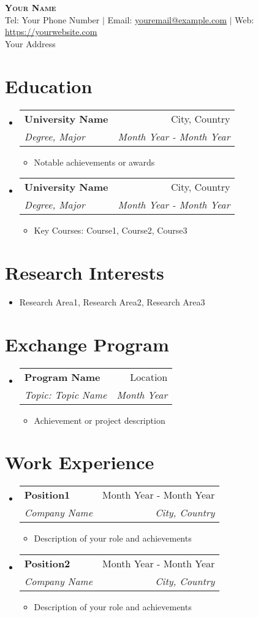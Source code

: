 \documentclass[letterpaper,11pt]{article}
\makeatletter
\newcommand{\resumeItem}[1]{
  \item\small{
    {#1 \vspace{-2pt}}
  }
}
\newcommand{\resumeSubheading}[4]{
  \vspace{-2pt}\item
    \begin{tabular*}{0.97\textwidth}[t]{l@{\extracolsep{\fill}}r}
      \textbf{#1} & #2 \\
      \textit{\small#3} & \textit{\small #4} \\
    \end{tabular*}\vspace{-7pt}
}
\newcommand{\resumeSubHeadingListStart}{\begin{itemize}[leftmargin=0.15in, label={}]}
\newcommand{\resumeSubHeadingListEnd}{\end{itemize}}
\newcommand{\resumeItemListStart}{\begin{itemize}}
\newcommand{\resumeItemListEnd}{\end{itemize}\vspace{-5pt}}
\makeatother
\begin{document}

\begin{center}
    \textbf{\Huge \scshape Your Name} \\ \vspace{1pt}
    \small Tel: Your Phone Number $|$ Email: \href{mailto:youremail@example.com}{\underline{youremail@example.com}} $|$ 
    Web: \href{https://yourwebsite.com}{\underline{https://yourwebsite.com}} \\
    Your Address
\end{center}

\section{Education}
  \resumeSubHeadingListStart
    \resumeSubheading
      {University Name}{City, Country}
      {Degree, Major}{Month Year - Month Year}
      \resumeItemListStart
        \resumeItem{Notable achievements or awards}
      \resumeItemListEnd
    \resumeSubheading
      {University Name}{City, Country}
      {Degree, Major}{Month Year - Month Year}
      \resumeItemListStart
        \resumeItem{Key Courses: Course1, Course2, Course3}
      \resumeItemListEnd
  \resumeSubHeadingListEnd

\section{Research Interests}
  \resumeSubHeadingListStart
    \resumeItem{Research Area1, Research Area2, Research Area3}
  \resumeSubHeadingListEnd

\section{Exchange Program}
  \resumeSubHeadingListStart
    \resumeSubheading
      {Program Name}{Location}
      {Topic: Topic Name}{Month Year}
      \resumeItemListStart
        \resumeItem{Achievement or project description}
      \resumeItemListEnd
  \resumeSubHeadingListEnd

\section{Work Experience}
  \resumeSubHeadingListStart
    \resumeSubheading
      {Position1}{Month Year - Month Year}
      {Company Name}{City, Country}
      \resumeItemListStart
        \resumeItem{Description of your role and achievements}
      \resumeItemListEnd
    \resumeSubheading
      {Position2}{Month Year - Month Year}
      {Company Name}{City, Country}
      \resumeItemListStart
        \resumeItem{Description of your role and achievements}
      \resumeItemListEnd
  \resumeSubHeadingListEnd
\end{document}
